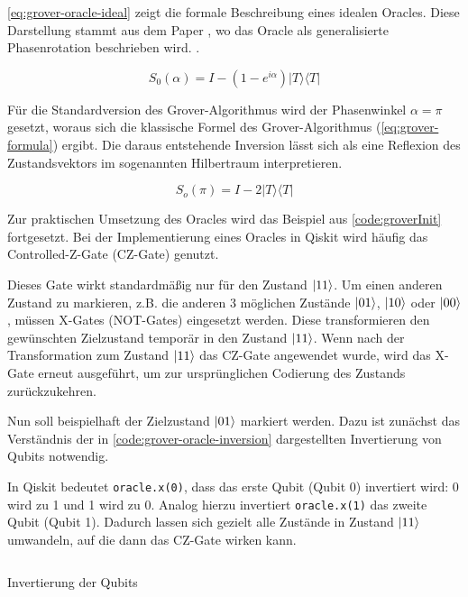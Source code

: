 \autoref{eq:grover-oracle-ideal} zeigt die formale Beschreibung eines idealen Oracles. Diese Darstellung stammt aus dem Paper , wo das Oracle als generalisierte Phasenrotation beschrieben wird. \autocite[2]{roy_deterministic_2022}.

\begin{equation}
\label{eq:grover-oracle-ideal}
S_0(\alpha) = I - (1 - e^{i\alpha})|T\rangle\langle T|
\end{equation}

Für die Standardversion des Grover-Algorithmus wird der Phasenwinkel $\alpha = \pi$ gesetzt, woraus sich die klassische Formel des Grover-Algorithmus (\autoref{eq:grover-formula}) ergibt. Die daraus entstehende Inversion lässt sich als eine Reflexion des Zustandsvektors im sogenannten Hilbertraum interpretieren. 

\begin{equation}
\label{eq:grover-formula}
S_o(\pi) = I - 2|T\rangle\langle T|
\end{equation}

Zur praktischen Umsetzung des Oracles wird das Beispiel aus \autoref{code:groverInit} fortgesetzt. Bei der Implementierung eines Oracles in Qiskit wird häufig das Controlled-Z-Gate (CZ-Gate) genutzt. 

Dieses Gate wirkt standardmäßig nur für den Zustand $\ket{11}$. Um einen anderen Zustand zu markieren, z.B. die anderen 3 möglichen Zustände $\ket{01}$, $\ket{10}$ oder $\ket{00}$, müssen X-Gates (NOT-Gates) eingesetzt werden. Diese transformieren den gewünschten Zielzustand temporär in den Zustand $\ket{11}$. Wenn nach der Transformation zum Zustand $\ket{11}$ das CZ-Gate angewendet wurde, wird das X-Gate erneut ausgeführt, um zur ursprünglichen Codierung des Zustands zurückzukehren.

Nun soll beispielhaft der Zielzustand $\ket{01}$ markiert werden. Dazu ist zunächst das Verständnis der in \autoref{code:grover-oracle-inversion} dargestellten Invertierung von Qubits notwendig.

In Qiskit bedeutet \texttt{oracle.x(0)}, dass das erste Qubit (Qubit 0) invertiert wird: 0 wird zu 1 und 1 wird zu 0. Analog hierzu invertiert \texttt{oracle.x(1)} das zweite Qubit (Qubit 1). Dadurch lassen sich gezielt alle Zustände in Zustand $\ket{11}$ umwandeln, auf die dann das CZ-Gate wirken kann.

\begin{listing}[ht!]
  \inputminted{python}{code/grover-oracle-inversion.py}
  \caption{Invertierung der Qubits}
  \label{code:grover-oracle-inversion}
\end{listing}

